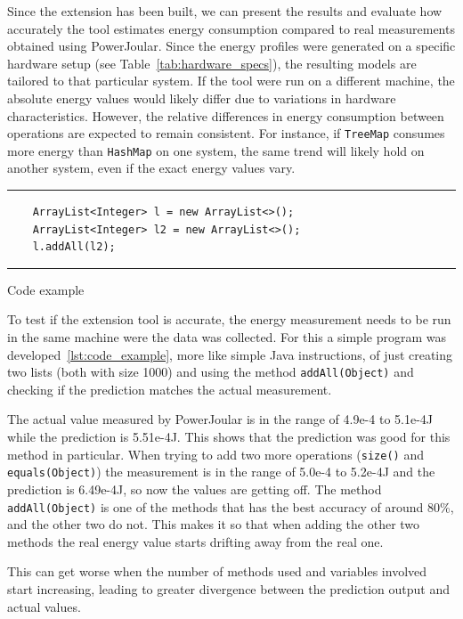 Since the extension has been built, we can present the results and evaluate how accurately the tool estimates energy consumption compared to real measurements obtained using PowerJoular. Since the energy profiles were generated on a specific hardware setup (see Table~\ref{tab:hardware_specs}), the resulting models are tailored to that particular system. If the tool were run on a different machine, the absolute energy values would likely differ due to variations in hardware characteristics. However, the relative differences in energy consumption between operations are expected to remain consistent. For instance, if \texttt{TreeMap} consumes more energy than \texttt{HashMap} on one system, the same trend will likely hold on another system, even if the exact energy values vary.

\begin{listing}[H]
\noindent\rule{\linewidth}{0.4pt}
\begin{verbatim}
    ArrayList<Integer> l = new ArrayList<>();
    ArrayList<Integer> l2 = new ArrayList<>();
    l.addAll(l2);
\end{verbatim}
\noindent\rule{\linewidth}{0.4pt}
\caption{Code example}            
\label{lst:code_example}
\end{listing}

To test if the extension tool is accurate, the energy measurement needs to be run in the same machine were the data was collected.
For this a simple program was developed~\ref{lst:code_example}, more like simple Java instructions, of just creating two lists (both with size 1000) and using the method \texttt{addAll(Object)} and checking if the prediction matches the actual measurement.

The actual value measured by PowerJoular is in the range of 4.9e-4 to 5.1e-4J while the prediction is 5.51e-4J. This shows that the prediction was good for this method in particular.
When trying to add two more operations (\texttt{size()} and \texttt{equals(Object)}) the measurement is in the range of 5.0e-4 to 5.2e-4J and the prediction is 6.49e-4J, so now the values are getting off. The method \texttt{addAll(Object)} is one of the methods that has the best accuracy of around 80\%, and the other two do not. This makes it so that when adding the other two methods the real energy value starts drifting away from the real one.

This can get worse when the number of methods used and variables involved start increasing, leading to greater divergence between the prediction output and actual values. 

